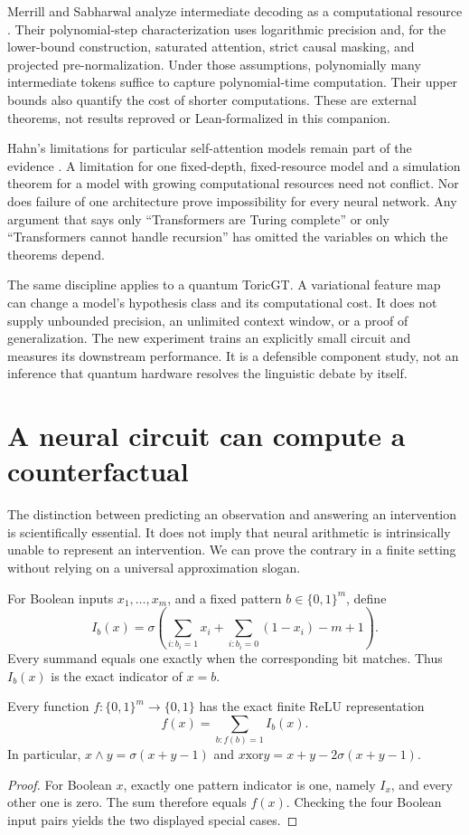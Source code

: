 Merrill and Sabharwal analyze intermediate decoding as a computational resource \cite{LLmerrill}. Their polynomial-step characterization uses logarithmic precision and, for the lower-bound construction, saturated attention, strict causal masking, and projected pre-normalization. Under those assumptions, polynomially many intermediate tokens suffice to capture polynomial-time computation. Their upper bounds also quantify the cost of shorter computations. These are external theorems, not results reproved or Lean-formalized in this companion.

Hahn's limitations for particular self-attention models remain part of the evidence \cite{LLhahn}. A limitation for one fixed-depth, fixed-resource model and a simulation theorem for a model with growing computational resources need not conflict. Nor does failure of one architecture prove impossibility for every neural network. Any argument that says only ``Transformers are Turing complete'' or only ``Transformers cannot handle recursion'' has omitted the variables on which the theorems depend.

The same discipline applies to a quantum ToricGT. A variational feature map can change a model's hypothesis class and its computational cost. It does not supply unbounded precision, an unlimited context window, or a proof of generalization. The new experiment trains an explicitly small circuit and measures its downstream performance. It is a defensible component study, not an inference that quantum hardware resolves the linguistic debate by itself.

\section{A neural circuit can compute a counterfactual}

The distinction between predicting an observation and answering an intervention is scientifically essential. It does not imply that neural arithmetic is intrinsically unable to represent an intervention. We can prove the contrary in a finite setting without relying on a universal approximation slogan.

For Boolean inputs $x_1,\ldots,x_m$, and a fixed pattern $b\in\{0,1\}^m$, define
\[
 I_b(x)=\sigma\left(\sum_{i:b_i=1}x_i+
                         \sum_{i:b_i=0}(1-x_i)-m+1\right).
\]
Every summand equals one exactly when the corresponding bit matches. Thus $I_b(x)$ is the exact indicator of $x=b$.

\begin{proposition}
Every function $f:\{0,1\}^m\to\{0,1\}$ has the exact finite ReLU representation
\[
 f(x)=\sum_{b:f(b)=1}I_b(x).
\]
In particular, $x\wedge y=\sigma(x+y-1)$ and
$x\mathbin{\mathrm{xor}}y=x+y-2\sigma(x+y-1)$.
\end{proposition}
\begin{proof}
For Boolean $x$, exactly one pattern indicator is one, namely $I_x$, and every other one is zero. The sum therefore equals $f(x)$. Checking the four Boolean input pairs yields the two displayed special cases.
\end{proof}

